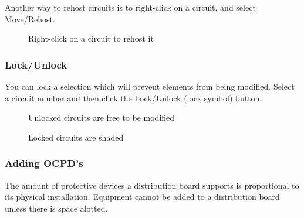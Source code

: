 \documentclass[letterpaper,10pt,english]{sphinxmanual}
\begin{document}
Another way to rehost circuits is to right-click on a circuit, and select Move/Rehost.

\begin{figure}[H]
\centering
\capstart

\noindent{}
\caption{Right-click on a circuit to rehost it}\label{\detokenize{docs/userguide/buildingelectricalmodel/schedules/index-schedules:id12}}\end{figure}


\subsubsection{Lock/Unlock}
\label{\detokenize{docs/userguide/buildingelectricalmodel/schedules/index-schedules:lock-unlock}}
You can lock a selection which will prevent elements from being modified.  Select a circuit number and then click the Lock/Unlock (lock symbol) button.

\begin{figure}[H]
\centering
\capstart

\noindent{}
\caption{Unlocked circuits are free to be modified}\label{\detokenize{docs/userguide/buildingelectricalmodel/schedules/index-schedules:id13}}\end{figure}

\begin{figure}[H]
\centering
\capstart

\noindent{}
\caption{Locked circuits are shaded}\label{\detokenize{docs/userguide/buildingelectricalmodel/schedules/index-schedules:id14}}\end{figure}

\ignorespaces 

\subsubsection{Adding OCPD’s}
\label{\detokenize{docs/userguide/buildingelectricalmodel/schedules/index-schedules:adding-ocpd-s}}\label{\detokenize{docs/userguide/buildingelectricalmodel/schedules/index-schedules:index-5}}
The amount of protective devices a distribution board supports is proportional to its physical installation.  Equipment cannot be added to a distribution board unless there is space alotted.
\end{document}
